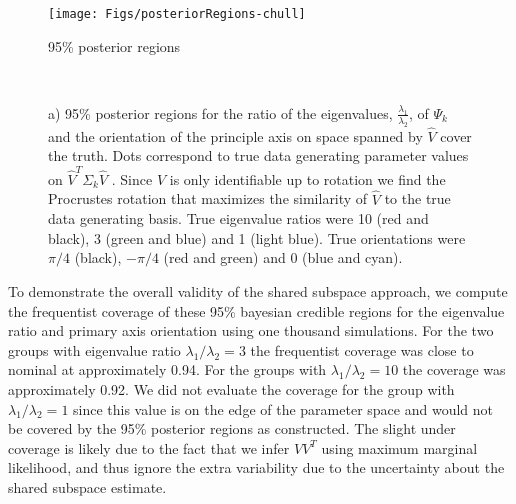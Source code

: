 \documentclass[12pt]{article}
\begin{document}
\begin{figure}[t]
    \centering
    \texttt{[image: Figs/posteriorRegions-chull]}
        \caption{95\% posterior regions}
        \label{fig:simPosterior}
    ~ %
    \caption{a) 95\% posterior regions for the ratio of the
      eigenvalues, $\frac{\lambda_1}{\lambda_2}$, of $\Psi_k$ and the
      orientation of the principle axis on space spanned by $\hat{V}$
      cover the truth.  Dots correspond to true data generating
      parameter values on $\hat{V}^T\Sigma_k\hat{V}$ .  Since $V$
      is only identifiable up to rotation we find the Procrustes
      rotation that maximizes the similarity of $\hat{V}$ to the true
      data generating basis. True eigenvalue ratios were 10 (red and
      black), 3 (green and blue) and 1 (light blue).  True
      orientations were $\pi/4$ (black), $-\pi/4$ (red and green) and
      0 (blue and cyan). %
    }
\end{figure}

To demonstrate the overall validity of the shared subspace approach,
we compute the frequentist coverage of these 95\% bayesian credible
regions for the eigenvalue ratio and primary axis orientation using
one thousand simulations.  For the two groups with eigenvalue ratio
$\lambda_1/\lambda_2 = 3$ the frequentist coverage was close to
nominal at approximately 0.94.  For the groups with
$\lambda_1/\lambda_2 = 10$ the coverage was approximately 0.92.  We
did not evaluate the coverage for the group with
$\lambda_1/\lambda_2 = 1$ since this value is on the edge of the
parameter space and would not be covered by the 95\% posterior regions
as constructed.  The slight under coverage is likely due to the fact
that we infer $VV^T$ using maximum marginal likelihood, and thus
ignore the extra variability due to the uncertainty about the shared
subspace estimate.
\end{document}
